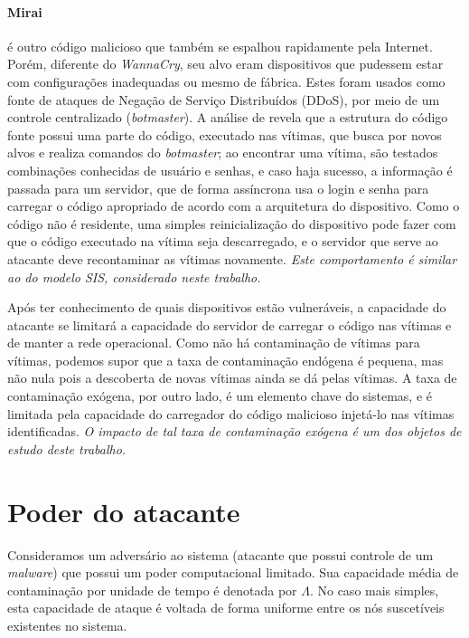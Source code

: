 		\paragraph*{Mirai}
		é outro código malicioso que também se espalhou rapidamente pela Internet. Porém, diferente do \emph{WannaCry}, seu alvo eram dispositivos que pudessem estar com configurações inadequadas ou mesmo de fábrica. Estes foram usados como fonte de ataques de Negação de Serviço Distribuídos (DDoS), por meio de um controle centralizado (\textit{botmaster}). A análise de \cite{antonakakis2017understanding} revela que a estrutura do código fonte possui uma parte do código, executado nas vítimas, que busca por novos alvos e realiza comandos do \textit{botmaster}; ao encontrar uma vítima, são testados combinações conhecidas de usuário e senhas, e caso haja sucesso, a informação é passada para um servidor, que de forma assíncrona usa o login e senha para carregar o código apropriado de acordo com a arquitetura do dispositivo. Como o código não é residente, uma simples reinicialização do dispositivo pode fazer com que o código executado na vítima seja descarregado, e o servidor que serve ao atacante deve recontaminar as vítimas novamente. \emph{Este comportamento é similar ao do modelo SIS, considerado neste trabalho.}
		
		Após ter conhecimento de quais dispositivos estão vulneráveis, a capacidade do atacante se limitará a capacidade do servidor de carregar o código nas vítimas e de manter a rede operacional. Como não há contaminação de vítimas para vítimas, podemos supor que a taxa de contaminação endógena é pequena, mas não nula pois a descoberta de novas vítimas ainda se dá pelas vítimas.  A taxa de contaminação exógena, por outro lado, é um elemento chave do sistemas, e é limitada pela capacidade do carregador do código malicioso injetá-lo nas vítimas identificadas.  \emph{O impacto de tal taxa de contaminação exógena é um dos objetos de estudo deste trabalho.}
		

\section{Poder do atacante}

Consideramos um adversário ao sistema (atacante que possui controle de um \emph{ malware}) que possui um poder computacional limitado. Sua capacidade média de contaminação por unidade de tempo  é denotada por  $\Lambda$. No caso mais simples, esta capacidade de ataque é voltada de forma uniforme entre os nós suscetíveis existentes no sistema.  



